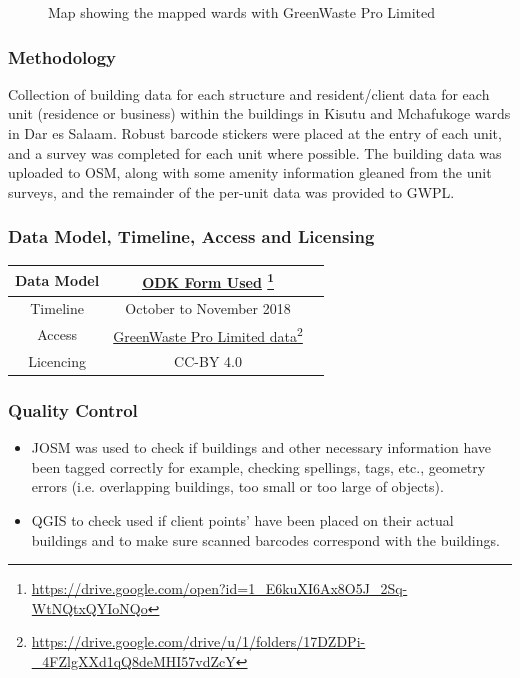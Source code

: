 \documentclass[a4paper,12pt,twoside]{article}
\begin{document}
\begin{figure}[h]
  \color{RHgreen}\caption{Map showing the mapped wards with GreenWaste Pro Limited}
  \centering
\end{figure}

\subsubsection{Methodology}

Collection of building data for each structure and resident/client data for each unit (residence or business) within the buildings in Kisutu and Mchafukoge wards in Dar es Salaam. Robust barcode stickers were placed at the entry of each unit, and a survey was completed for each unit where possible. The building data was uploaded to OSM, along with some amenity information gleaned from the unit surveys, and the remainder of the per-unit data was provided to GWPL.

\subsubsection{Data Model, Timeline, Access and Licensing}
\begin{center}
\begin{tabular}{|c|c|c|}  
 \hline
Data Model &
       \href{https://drive.google.com/open?id=1_E6kuXI6Ax8O5J_2Sq-WtNQtxQYIoNQo}{ODK Form Used} \footnote{\url{https://drive.google.com/open?id=1_E6kuXI6Ax8O5J_2Sq-WtNQtxQYIoNQo}} \\
 \hline
  Timeline  &  October to November 2018 \\
\hline  
 Access  & 
    \href{https://drive.google.com/drive/u/1/folders/17DZDPi-_4FZlgXXd1qQ8deMHI57vdZcY}{GreenWaste Pro Limited data}\footnote{\url{https://drive.google.com/drive/u/1/folders/17DZDPi-_4FZlgXXd1qQ8deMHI57vdZcY}} \\
   
\hline 
    Licencing & CC-BY 4.0 \\
\hline
\end{tabular}
\end{center}

\subsubsection{Quality Control}
\begin{itemize}
    \item JOSM was used to check if buildings and other necessary information have been tagged correctly for example, checking spellings, tags, etc., geometry errors (i.e. overlapping buildings, too small or too large of objects). 
     \item QGIS to check used if client points' have been placed on their actual buildings and to make sure scanned barcodes correspond with the buildings.
\end{itemize}
\end{document}
